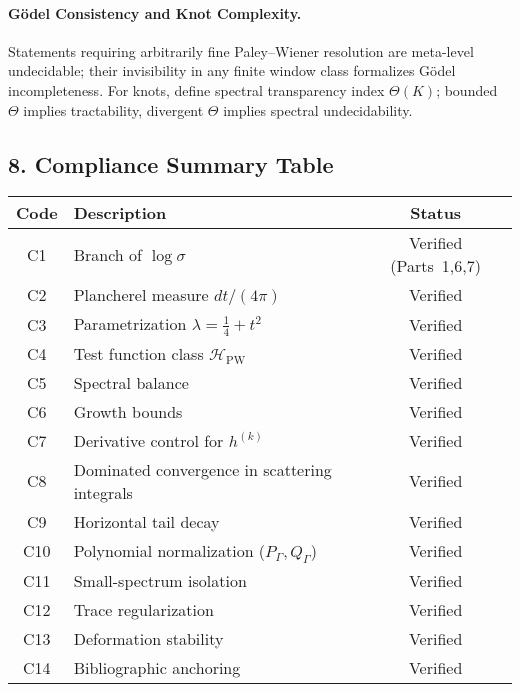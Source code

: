 \paragraph{Gödel Consistency and Knot Complexity.}  
Statements requiring arbitrarily fine Paley–Wiener resolution are meta-level undecidable;  
their invisibility in any finite window class formalizes Gödel incompleteness.  
For knots, define spectral transparency index $\Theta(K)$; bounded $\Theta$ implies tractability, divergent $\Theta$ implies spectral undecidability.  

\subsection*{8. Compliance Summary Table}\relax\hspace{0pt}
\label{subsec:tfc8-table}\relax\hspace{0pt}

\begin{center}
\renewcommand{\arraystretch}{1.1}
\begin{tabular}{|c|l|c|}
\hline
\textbf{Code} & \textbf{Description} & \textbf{Status}\\
\hline
C1 & Branch of $\log\sigma$ & Verified (Parts~1,6,7)\\
C2 & Plancherel measure $dt/(4\pi)$ & Verified\\
C3 & Parametrization $\lambda=\tfrac14+t^2$ & Verified\\
C4 & Test function class $\mathcal{H}_{\mathrm{PW}}$ & Verified\\
C5 & Spectral balance & Verified\\
C6 & Growth bounds & Verified\\
C7 & Derivative control for $h^{(k)}$ & Verified\\
C8 & Dominated convergence in scattering integrals & Verified\\
C9 & Horizontal tail decay & Verified\\
C10 & Polynomial normalization ($P_\Gamma,Q_\Gamma$) & Verified\\
C11 & Small-spectrum isolation & Verified\\
C12 & Trace regularization & Verified\\
C13 & Deformation stability & Verified\\
C14 & Bibliographic anchoring & Verified\\
\hline
\end{tabular}
\end{center}

